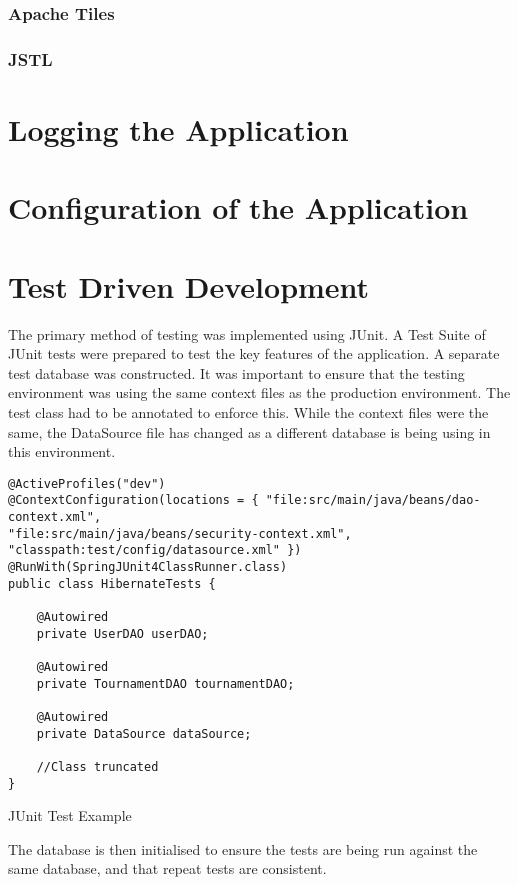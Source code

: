 \subsubsection{Apache Tiles}
\subsubsection{JSTL}

\section{Logging the Application}

\section{Configuration of the Application}

\section{Test Driven Development}

The primary method of testing was implemented using JUnit. A Test Suite of JUnit tests were prepared to test the key features of the application. A separate test database was constructed. It was important to ensure that the testing environment was using the same context files as the production environment. The test class had to be annotated to enforce this. While the context files were the same, the DataSource file has changed as a different database is being using in this environment.


\begin{table}[H]
\begin{lstlisting}
@ActiveProfiles("dev")
@ContextConfiguration(locations = { "file:src/main/java/beans/dao-context.xml",
"file:src/main/java/beans/security-context.xml",
"classpath:test/config/datasource.xml" })
@RunWith(SpringJUnit4ClassRunner.class)
public class HibernateTests {
	
	@Autowired
	private UserDAO userDAO;
	
	@Autowired
	private TournamentDAO tournamentDAO;
	
	@Autowired
	private DataSource dataSource;
	
	//Class truncated 
}

\end{lstlisting}
\caption{JUnit Test Example}
\end{table}

The database is then initialised to ensure the tests are being run against the same database, and that repeat tests are consistent.

